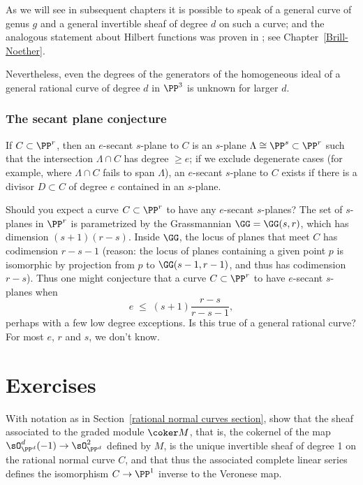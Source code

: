 As we will see in subsequent chapters it is possible to speak of a general curve of genus $g$
and a general invertible sheaf of degree $d$ on such a curve; and the analogous statement 
about Hilbert functions  was proven in \cite{ELarson2018}; see Chapter~\ref{Brill-Noether}.

Nevertheless, even the degrees of the generators of the homogeneous ideal of a general
rational curve of degree $d$ in $\PP^3$ is unknown for larger $d$. 

\subsubsection{The secant plane conjecture}

If $C \subset \PP^r$, then an $e$-secant $s$-plane to $C$ is an $s$-plane $\Lambda \cong \PP^s \subset \PP^r$ such that the intersection $\Lambda \cap C$ has degree $\geq e$; if we exclude degenerate cases (for example, where $\Lambda \cap C$ fails to span $\Lambda$), an $e$-secant $s$-plane to $C$ exists if there is a divisor $D \subset C$ of degree $e$  contained in an $s$-plane.

Should you expect a curve $C \subset \PP^r$ to have any $e$-secant $s$-planes? The set of $s$-planes in $\PP^r$ is parametrized by the Grassmannian $\GG = \GG(s,r)$, which has dimension $(s+1)(r-s)$. Inside $\GG$, the locus of planes that meet $C$ has codimension $r-s-1$ (reason: the locus of planes containing a given point $p$ is isomorphic
by projection from $p$ to $\GG(s-1,r-1)$, and thus has codimension $r-s$). Thus one might conjecture that a curve $C \subset \PP^r$ to have $e$-secant $s$-planes when 
$$
e \; \leq \; (s+1)\frac{r-s}{r-s-1},
$$
perhaps with a few low degree exceptions. Is this true of a general rational curve? For most $e$, $r$ and $s$, we don't know.

\section{Exercises}

\begin{exercise}\label{veronese inverse}
With notation as in Section~\ref{rational normal curves section}, show that the sheaf associated to the graded module $\coker M$,
that is, the cokernel of the map $\sO_{\PP^d}^d(-1) \to \sO_{\PP^d}^2$ defined by $M$, is the unique invertible sheaf of degree 1
on the rational normal curve $C$, and that thus the associated complete linear series defines the isomorphism $C\to \PP^1$ inverse
to the Veronese map.
\end{exercise}

